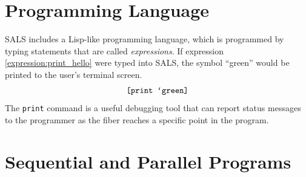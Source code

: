 \section{Programming Language}

SALS includes a Lisp-like programming language, which is programmed
by typing statements that are called \emph{expressions}.  If
expression \ref{expression:print_hello} were typed into SALS, the
symbol ``green'' would be printed to the user's terminal screen.
\begin{equation}
\label{expression:print_hello}
\text{\tt [print `green]}
\end{equation}
The {\tt print} command is a useful debugging tool that can report
status messages to the programmer as the fiber reaches a specific
point in the program.

\section{Sequential and Parallel Programs}

